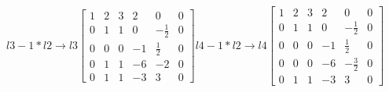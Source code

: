 \documentclass[10pt]{article}
\begin{document}
$l3-1*l2 \rightarrow l3\left[\begin{array}{ccccc|c}1 & 2 & 3 & 2 & 0 & 0 \\ 0 & 1 & 1 & 0 & -\frac{1}{2} & 0 \\ 0 & 0 & 0 & -1 & \frac{1}{2} & 0 \\ 0 & 1 & 1 & -6 & -2 & 0 \\ 0 & 1 & 1 & -3 & 3 & 0\end{array}\right] l4 - 1 * l2 \rightarrow l4 \left[\begin{array}{ccccc|c}1 & 2 & 3 & 2 & 0 & 0 \\ 0 & 1 & 1 & 0 & -\frac{1}{2} & 0 \\ 0 & 0 & 0 & -1 & \frac{1}{2} & 0 \\ 0 & 0 & 0 & -6 & -\frac{3}{2} & 0 \\ 0 & 1 & 1 & -3 & 3 & 0\end{array}\right]$
\end{document}
